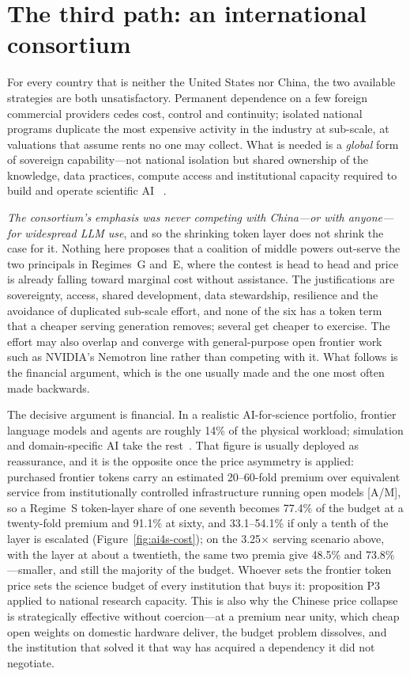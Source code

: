 \section{The third path: an international consortium}

For every country that is neither the United States nor China, the two available strategies are both unsatisfactory. Permanent dependence on a few foreign commercial providers cedes cost, control and continuity; isolated national programs duplicate the most expensive activity in the industry at sub-scale, at valuations that assume rents no one may collect. What is needed is a \emph{global} form of sovereign capability---not national isolation but shared ownership of the knowledge, data practices, compute access and institutional capacity required to build and operate scientific AI~\cite{consortium-record} .

\emph{The consortium's emphasis was never competing with China---or with anyone---for widespread LLM use}, and so the shrinking token layer does not shrink the case for it. Nothing here proposes that a coalition of middle powers out-serve the two principals in Regimes~G and~E, where the contest is head to head and price is already falling toward marginal cost without assistance. The justifications are sovereignty, access, shared development, data stewardship, resilience and the avoidance of duplicated sub-scale effort, and none of the six has a token term that a cheaper serving generation removes; several get cheaper to exercise. The effort may also overlap and converge with general-purpose open frontier work such as NVIDIA's Nemotron line rather than competing with it. What follows is the financial argument, which is the one usually made and the one most often made backwards.

The decisive argument is financial. In a realistic AI-for-science portfolio, frontier language models and agents are roughly 14\% of the physical workload; simulation and domain-specific AI take the rest~\cite{consortium-record}. That figure is usually deployed as reassurance, and it is the opposite once the price asymmetry is applied: purchased frontier tokens carry an estimated 20--60-fold premium over equivalent service from institutionally controlled infrastructure running open models [A/M], so a Regime~S token-layer share of one seventh becomes 77.4\% of the budget at a twenty-fold premium and 91.1\% at sixty, and 33.1--54.1\% if only a tenth of the layer is escalated (Figure~\ref{fig:ai4s-cost}); on the 3.25$\times$ serving scenario above, with the layer at about a twentieth, the same two premia give 48.5\% and 73.8\%---smaller, and still the majority of the budget. Whoever sets the frontier token price sets the science budget of every institution that buys it: proposition P3 applied to national research capacity. This is also why the Chinese price collapse is strategically effective without coercion---at a premium near unity, which cheap open weights on domestic hardware deliver, the budget problem dissolves, and the institution that solved it that way has acquired a dependency it did not negotiate.

